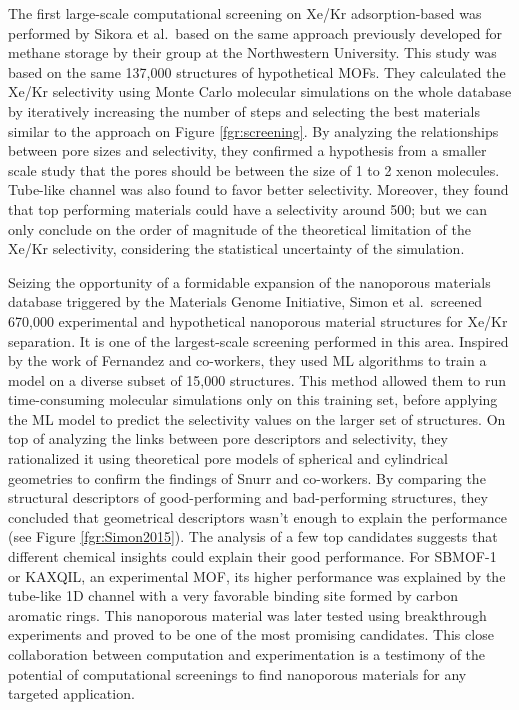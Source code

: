 \documentclass[main.tex]{subfiles}
\begin{document}
The first large-scale computational screening on Xe/Kr adsorption-based was performed by Sikora et al.\ based on the same approach previously developed for methane storage by their group at the Northwestern University.\cite{Sikora_2012} This study was based on the same {137,000} structures of hypothetical MOFs.\cite{Wilmer_2012} They calculated the Xe/Kr selectivity using Monte Carlo molecular simulations on the whole database by iteratively increasing the number of steps and selecting the best materials similar to the approach on Figure \ref{fgr:screening}. By analyzing the relationships between pore sizes and selectivity, they confirmed a hypothesis from a smaller scale study that the pores should be between the size of 1 to 2 xenon molecules.\cite{Ryan_2010} Tube-like channel was also found to favor better selectivity. Moreover, they found that top performing materials could have a selectivity around 500; but we can only conclude on the order of magnitude of the theoretical limitation of the Xe/Kr selectivity, considering the statistical uncertainty of the simulation.

Seizing the opportunity of a formidable expansion of the nanoporous materials database triggered by the Materials Genome Initiative, Simon et al.\ screened 670,000 experimental and hypothetical nanoporous material structures for Xe/Kr separation.\cite{Simon_2015} It is one of the largest-scale screening performed in this area. Inspired by the work of Fernandez and co-workers,\cite{Fernandez_2013} they used ML algorithms to train a model on a diverse subset of 15,000 structures. This method allowed them to run time-consuming molecular simulations only on this training set, before applying the ML model to predict the selectivity values on the larger set of structures. On top of analyzing the links between pore descriptors and selectivity, they rationalized it using theoretical pore models of spherical and cylindrical geometries to confirm the findings of Snurr and co-workers.\cite{Ryan_2010,Sikora_2012} By comparing the structural descriptors of good-performing and bad-performing structures, they concluded that geometrical descriptors wasn't enough to explain the performance (see Figure \ref{fgr:Simon2015}). The analysis of a few top candidates suggests that different chemical insights could explain their good performance. For SBMOF-1 or KAXQIL,\cite{KAXQIL} an experimental MOF, its higher performance was explained by the tube-like 1D channel with a very favorable binding site formed by carbon aromatic rings. This nanoporous material was later tested using breakthrough experiments and proved to be one of the most promising candidates.\cite{Banerjee_2016} This close collaboration between computation and experimentation is a testimony of the potential of computational screenings to find nanoporous materials for any targeted application.
\end{document}
